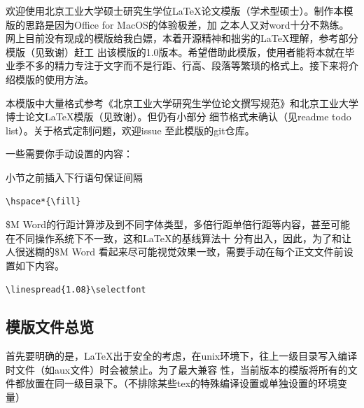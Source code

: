\label{chap:intro}
\linespread{1.08}\selectfont

欢迎使用北京工业大学硕士研究生学位\LaTeX 论文模版（学术型硕士）。制作本模版的思路是因为Office for MacOS的体验极差，加
之本人又对word十分不熟练。网上目前没有现成的模版给我白嫖，本着开源精神和拙劣的\LaTeX 理解，参考部分模版（见致谢）赶工
出该模版的1.0版本。希望借助此模版，使用者能将本就在毕业季不多的精力专注于文字而不是行距、行高、段落等繁琐的格式上。接下来将介绍模版的使用方法。

本模版中大量格式参考《北京工业大学研究生学位论文撰写规范》和北京工业大学博士论文\LaTeX 模版（见致谢）。但仍有小部分
细节格式未确认（见readme todo list）。关于格式定制问题，欢迎issue 至此模版的git仓库。

一些需要你手动设置的内容：

小节之前插入下行语句保证间隔
\begin{center}
  \begin{minipage}{0.5\textwidth}
    \begin{Verbatim}[frame=single]
    \hspace*{\fill}
    \end{Verbatim}
  \end{minipage}
\end{center}

\$M Word的行距计算涉及到不同字体类型，多倍行距单倍行距等内容，甚至可能在不同操作系统下不一致，这和\LaTeX 的基线算法十
分有出入，因此，为了和让人很迷糊的\$M Word 看起来尽可能视觉效果一致，需要手动在每个正文文件前设置如下内容。

\begin{center}
  \begin{minipage}{0.5\textwidth}
    \begin{Verbatim}[frame=single]
\linespread{1.08}\selectfont
    \end{Verbatim}
  \end{minipage}
\end{center}


\hspace*{\fill}

\label{sec:fst}
\subsection{模版文件总览}
首先要明确的是，\LaTeX 出于安全的考虑，在unix环境下，往上一级目录写入编译时文件（如aux文件）时会被禁止。为了最大兼容
性，当前版本的模版将所有的文件都放置在同一级目录下。（不排除某些tex的特殊编译设置或单独设置的环境变量）

